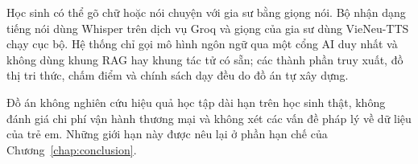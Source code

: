 Học sinh có thể gõ chữ hoặc nói chuyện với gia sư bằng giọng nói. Bộ nhận dạng tiếng nói dùng Whisper trên dịch vụ Groq và giọng của gia sư dùng VieNeu-TTS chạy cục bộ. Hệ thống chỉ gọi mô hình ngôn ngữ qua một cổng AI duy nhất và không dùng khung RAG hay khung tác tử có sẵn; các thành phần truy xuất, đồ thị tri thức, chấm điểm và chính sách dạy đều do đồ án tự xây dựng.

Đồ án không nghiên cứu hiệu quả học tập dài hạn trên học sinh thật, không đánh giá chi phí vận hành thương mại và không xét các vấn đề pháp lý về dữ liệu của trẻ em. Những giới hạn này được nêu lại ở phần hạn chế của Chương~\ref{chap:conclusion}.
